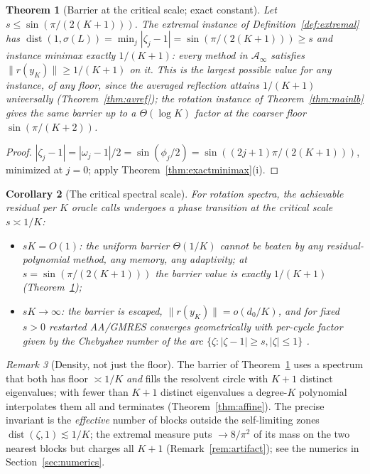 \documentclass[11pt]{article}
\newtheorem{theorem}{Theorem}[section]
\newtheorem{corollary}[theorem]{Corollary}
\theoremstyle{definition}
\theoremstyle{remark}
\newtheorem{remark}[theorem]{Remark}
\DeclareMathOperator{\dist}{dist}
\newcommand{\Aa}{\mathcal{A}}
\newcommand{\norm}[1]{\| #1 \|}
\newcommand{\abs}[1]{| #1 |}
\begin{document}
\begin{theorem}[Barrier at the critical scale; exact constant]\label{thm:barrier}
Let $s\le\sin(\pi/(2(K+1)))$. The extremal instance of
Definition~\ref{def:extremal} has
$\dist(1,\sigma(L))=\min_j\abs{\zeta_j-1}=\sin(\pi/(2(K+1)))\ge s$ and
instance minimax \emph{exactly} $1/(K+1)$: every method in $\Aa_\infty$
satisfies $\norm{r(y_K)}\ge1/(K+1)$ on it. This is the largest possible
value for any instance, of any floor, since the averaged reflection
attains $1/(K+1)$ universally (Theorem~\ref{thm:avref}); the rotation
instance of Theorem~\ref{thm:mainlb} gives the same barrier up to a
$\Theta(\log K)$ factor at the coarser floor $\sin(\pi/(K+2))$.
\end{theorem}
\begin{proof}
$\abs{\zeta_j-1}=\abs{\omega_j-1}/2=\sin(\phi_j/2)=\sin((2j+1)\pi/(2(K+1)))$,
minimized at $j=0$; apply Theorem~\ref{thm:exactminimax}(i).
\end{proof}

\begin{corollary}[The critical spectral scale]\label{cor:critical}
For rotation spectra, the achievable residual per $K$ oracle calls undergoes
a phase transition at the critical scale $s\asymp 1/K$:
\begin{itemize}
\item $sK=O(1)$: the uniform barrier $\Theta(1/K)$ cannot be beaten by
      any residual-polynomial method, any memory, any adaptivity; at
      $s=\sin(\pi/(2(K+1)))$ the barrier value is exactly $1/(K+1)$
      (Theorem~\ref{thm:barrier});
\item $sK\to\infty$: the barrier is escaped,
      $\norm{r(y_K)}=o(d_0/K)$, and for fixed $s>0$ restarted AA/GMRES
      converges geometrically with per-cycle factor given by the Chebyshev
      number of the arc $\{\zeta:\abs{\zeta-1}\ge s,\abs{\zeta}\le1\}$
      \cite{saad1986gmres,joubert1994convergence,eiermann1992hybrid}.
\end{itemize}
\end{corollary}

\begin{remark}[Density, not just the floor]\label{rem:density}
The barrier of Theorem~\ref{thm:barrier} uses a spectrum that both has floor
$\asymp1/K$ \emph{and} fills the resolvent circle with $K+1$ distinct
eigenvalues; with fewer than $K+1$ distinct eigenvalues a degree-$K$
polynomial interpolates them all and terminates
(Theorem~\ref{thm:affine}). The precise invariant is the \emph{effective}
number of blocks outside the self-limiting zones
$\dist(\zeta,1)\lesssim1/K$; the extremal measure puts $\to8/\pi^2$ of its
mass on the two nearest blocks but charges all $K+1$
(Remark~\ref{rem:artifact}); see the numerics in
Section~\ref{sec:numerics}.
\end{remark}
\end{document}
